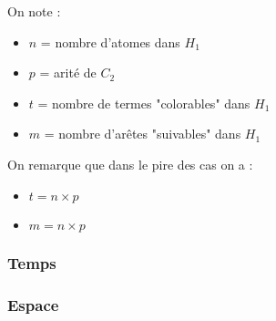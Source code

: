 On note :
\begin{itemize}
	\item $n$ = nombre d'atomes dans $H_{1}$
	\item $p$ = arit\'e de $C_{2}$
	\item $t$ = nombre de termes "colorables" dans $H_{1}$
	\item $m$ = nombre d'ar\^etes "suivables" dans $H_{1}$
\end{itemize}

On remarque que dans le pire des cas on a :
\begin{itemize}
	\item $t = n \times p$
	\item $m = n \times p$
\end{itemize}

\subsubsection{Temps}
	

\subsubsection{Espace}
	

